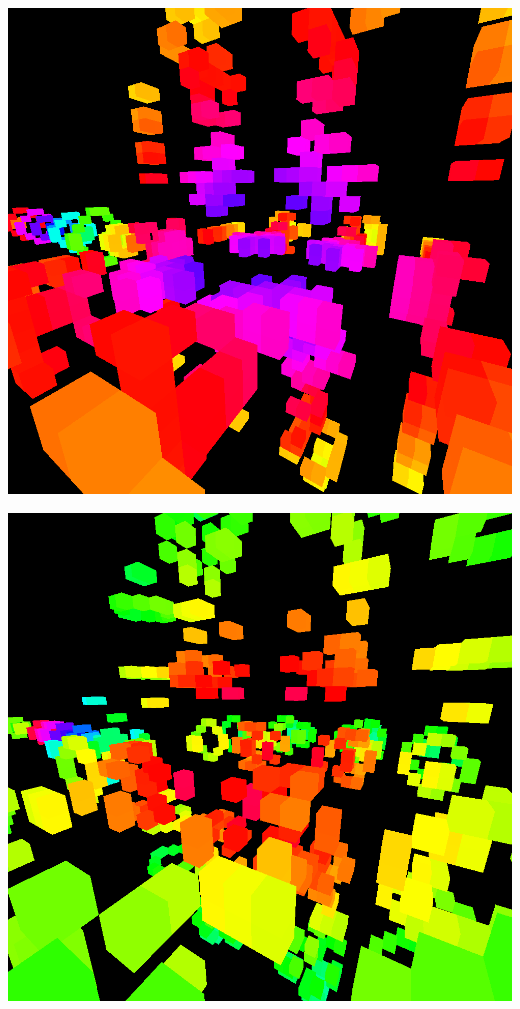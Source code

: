 \documentclass[11pt]{article}
\begin{document}
\begin{center}
\includegraphics[width=.9\linewidth]{img/6-3.png}
\end{center}

\begin{center}
\includegraphics[width=.9\linewidth]{img/7-3.png}
\end{center}
\end{document}

